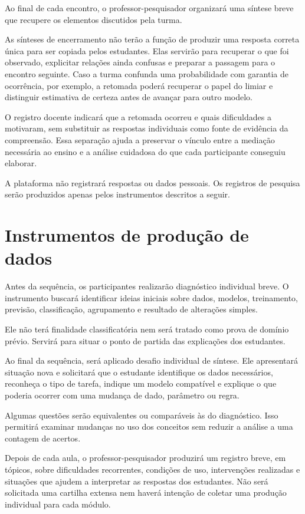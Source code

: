 Ao final de cada encontro, o professor-pesquisador organizará uma síntese breve que recupere os elementos discutidos pela turma.

As sínteses de encerramento não terão a função de produzir uma resposta correta única para ser copiada pelos estudantes. Elas servirão para recuperar o que foi observado, explicitar relações ainda confusas e preparar a passagem para o encontro seguinte. Caso a turma confunda uma probabilidade com garantia de ocorrência, por exemplo, a retomada poderá recuperar o papel do limiar e distinguir estimativa de certeza antes de avançar para outro modelo.

O registro docente indicará que a retomada ocorreu e quais dificuldades a motivaram, sem substituir as respostas individuais como fonte de evidência da compreensão. Essa separação ajuda a preservar o vínculo entre a mediação necessária ao ensino e a análise cuidadosa do que cada participante conseguiu elaborar.

A plataforma não registrará respostas ou dados pessoais. Os registros de pesquisa serão produzidos apenas pelos instrumentos descritos a seguir.

\section{Instrumentos de produção de dados}

Antes da sequência, os participantes realizarão diagnóstico individual breve. O instrumento buscará identificar ideias iniciais sobre dados, modelos, treinamento, previsão, classificação, agrupamento e resultado de alterações simples.

Ele não terá finalidade classificatória nem será tratado como prova de domínio prévio. Servirá para situar o ponto de partida das explicações dos estudantes.

Ao final da sequência, será aplicado desafio individual de síntese. Ele apresentará situação nova e solicitará que o estudante identifique os dados necessários, reconheça o tipo de tarefa, indique um modelo compatível e explique o que poderia ocorrer com uma mudança de dado, parâmetro ou regra.

Algumas questões serão equivalentes ou comparáveis às do diagnóstico. Isso permitirá examinar mudanças no uso dos conceitos sem reduzir a análise a uma contagem de acertos.

Depois de cada aula, o professor-pesquisador produzirá um registro breve, em tópicos, sobre dificuldades recorrentes, condições de uso, intervenções realizadas e situações que ajudem a interpretar as respostas dos estudantes. Não será solicitada uma cartilha extensa nem haverá intenção de coletar uma produção individual para cada módulo.

